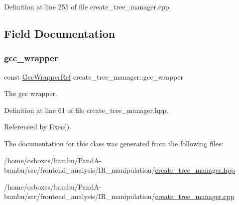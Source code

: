 Definition at line 255 of file create\+\_\+tree\+\_\+manager.\+cpp.



\subsection{Field Documentation}
\mbox{\label{classcreate__tree__manager_a5a04d4b8157ffa3da271d89f0b3d7bfe}} 
\subsubsection{\texorpdfstring{gcc\+\_\+wrapper}{gcc\_wrapper}}
{\footnotesize\ttfamily const \hyperlink{gcc__wrapper_8hpp_aba2a317cdd5bc8aa85483a128966782d}{Gcc\+Wrapper\+Ref} create\+\_\+tree\+\_\+manager\+::gcc\+\_\+wrapper\hspace{0.3cm}{\ttfamily [private]}}



The gcc wrapper. 



Definition at line 61 of file create\+\_\+tree\+\_\+manager.\+hpp.



Referenced by Exec().



The documentation for this class was generated from the following files\+:\begin{DoxyCompactItemize}
\item 
/home/osboxes/bambu/\+Pand\+A-\/bambu/src/frontend\+\_\+analysis/\+I\+R\+\_\+manipulation/\hyperlink{create__tree__manager_8hpp}{create\+\_\+tree\+\_\+manager.\+hpp}\item 
/home/osboxes/bambu/\+Pand\+A-\/bambu/src/frontend\+\_\+analysis/\+I\+R\+\_\+manipulation/\hyperlink{create__tree__manager_8cpp}{create\+\_\+tree\+\_\+manager.\+cpp}\end{DoxyCompactItemize}
